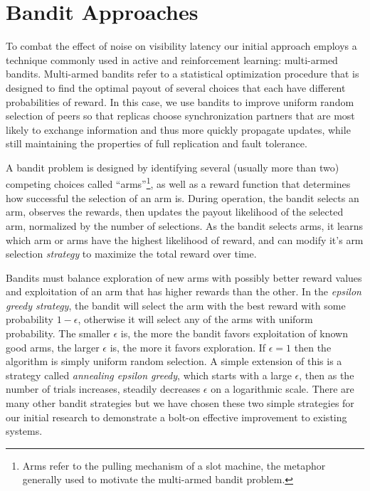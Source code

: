 \section{Bandit Approaches}

To combat the effect of noise on visibility latency our initial approach
employs a technique commonly used in active and reinforcement learning:
multi-armed bandits.
Multi-armed bandits refer to a statistical optimization procedure that is
designed to find the optimal payout of several choices that each have
different probabilities of reward.
In this case, we use bandits to improve uniform random selection of peers so
that replicas choose synchronization partners that are most likely to exchange
information and thus more quickly propagate updates, while still maintaining
the properties of full replication and fault tolerance.

A bandit problem is designed by identifying several (usually more than two)
competing choices called ``arms''\footnote{Arms refer to the pulling
mechanism of a slot machine, the metaphor generally used to motivate the
multi-armed bandit problem.}, as well as a reward function that determines how
successful the selection of an arm is.
During operation, the bandit selects an arm, observes the rewards, then
updates the payout likelihood of the selected arm, normalized by the number
of selections.
As the bandit selects arms, it learns which arm or arms have the highest
likelihood of reward, and can modify it's arm selection \emph{strategy} to
maximize the total reward over time.

Bandits must balance exploration of new arms with possibly better reward
values and exploitation of an arm that has higher rewards than the other.
In the \emph{epsilon greedy strategy}, the bandit will select the arm with
the best reward with some probability $1-\epsilon$, otherwise it will select
any of the arms with uniform probability.
The smaller $\epsilon$ is, the more the bandit favors exploitation of known
good arms, the larger $\epsilon$ is, the more it favors exploration.
If $\epsilon=1$ then the algorithm is simply uniform random selection.
A simple extension of this is a strategy called \emph{annealing epsilon
greedy}, which starts with a large $\epsilon$, then as the number of trials
increases, steadily decreases $\epsilon$ on a logarithmic scale.
There are many other bandit strategies but we have chosen these two simple
strategies for our initial research to demonstrate a bolt-on effective
improvement to existing systems.

